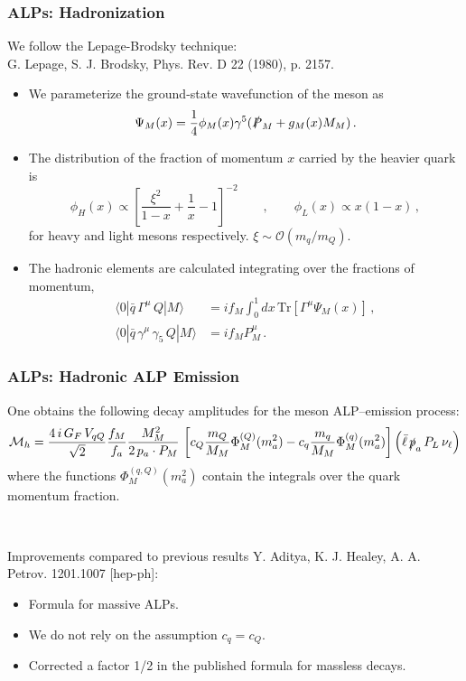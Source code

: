 \documentclass[mathserif, 10pt, dvipsnames]{beamer}
\newcommand\colorcite[1]{{\scriptsize\color{unizarblue}#1}}
\begin{document}
\begin{frame}\frametitle{ALPs: Hadronization}
We follow the Lepage-Brodsky technique:\\
\colorcite{G. Lepage, S. J. Brodsky, Phys. Rev. D 22 (1980), p. 2157.}
    \begin{itemize}
        \item We parameterize the ground-state wavefunction of the meson as
              $$\Psi_M(x)=\frac{1}{4}\phi_M(x)\gamma^5(\slashed{P}_M + g_M(x) M_M)\,.$$
        \item The distribution of the fraction of momentum $x$ carried by the heavier quark is
              $$\phi_H(x) \propto  \left[\frac{\xi^2}{1-x}+\frac{1}{x}-1\right]^{-2} \qquad , \qquad \phi_L(x) \propto  x(1-x) \,,$$
              for heavy and light mesons respectively. $\xi\sim \mathcal{O}(m_q/m_Q)$.
        \item The hadronic elements are calculated integrating over the fractions of momentum,
              \begin{align*}
                  \langle 0| \bar{q}\,\Gamma^{\mu}\,Q |M\rangle          & = i f_M \int_0^1 dx\,\mathrm{Tr}\left[\Gamma^{\mu} \Psi_M (x)\right]\,, \\
                  \langle 0|\bar{q}\,\gamma^\mu \,\gamma_5 \,Q |M\rangle & = i f_M P_M^\mu \,.
              \end{align*}

    \end{itemize}
\end{frame}

\begin{frame}\frametitle{ALPs: Hadronic ALP Emission}
    One obtains the following decay amplitudes for the meson ALP--emission process:
    {\small $$\mathcal{M}_{h} = \frac{4\,i\,G_F\,V_{qQ}}{\sqrt{2}} \frac{f_M}{f_a} \frac{M_M^2}{2\,p_a \cdot P_M} \,
        \left[ c_Q \frac{m_Q}{M_M} \Phi^{(Q)}_M(m_a^2) - c_q \frac{m_q}{M_M} \Phi^{(q)}_M (m_a^2) \right]
        \left(\bar{\ell} \, \slashed{p}_a \,P_L \, \nu_\ell \right)$$}
    where the functions $\Phi^{(q,Q)}_M (m_a^2)$ contain the integrals over the quark momentum fraction.

    ~

Improvements compared to previous results \colorcite{Y. Aditya, K. J. Healey, A. A. Petrov. 1201.1007 [hep-ph]}:
    \begin{itemize}
        \item Formula for massive ALPs.
        \item We do not rely on the assumption $c_q = c_Q$.
\item Corrected a factor 1/2 in the published formula for massless decays.
    \end{itemize}

\end{frame}
\end{document}
